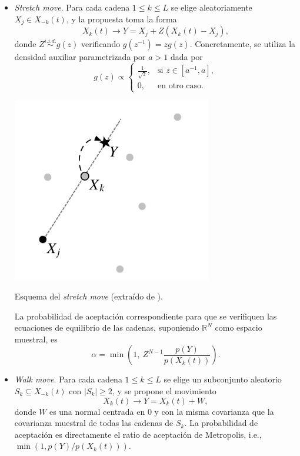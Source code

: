 \documentclass[
  a4paper,
	fontsize=11pt, %
	twoside=false, %
  secnumdepth=2,
	numbers=noenddot, %
]{kaohandt}
\newcommand{\R} {\ensuremath{\mathds{R}}}
\begin{document}
\begin{itemize}
  \item \textit{Stretch move}. Para cada cadena \(1\leq k \leq L\) se elige aleatoriamente \(X_j \in X_{-k}(t)\), y la propuesta toma la forma
  \[
    X_k(t) \to Y = X_j + Z(X_k(t) - X_j),
  \]
  donde \(Z \stackrel{i.i.d.}{\sim} g(z)\) verificando \(g(z^{-1})=zg(z)\). Concretamente, se utiliza la densidad auxiliar parametrizada por \(a > 1\) dada por
  \[
  g(z) \propto \begin{cases}
    \frac{1}{\sqrt{z}}, & \text{si } z \in [a^{-1}, a],\\
    0, & \text{en otro caso.}
\end{cases}
  \]
  \begin{marginfigure}[*-1]
  \centering
  \includegraphics[width=.8\textwidth]{img/goodman_weare}
  \caption*{Esquema del \textit{stretch move} (extraído de \cite{goodman2010ensemble}).}
\end{marginfigure}

  La probabilidad de aceptación correspondiente para que se verifiquen las ecuaciones de equilibrio de las cadenas, suponiendo \(\R^N\) como espacio muestral, es
  \[
    \alpha = \min\left(1, \ Z^{N-1}\frac{p(Y)}{p(X_k(t))}\right).
  \]

  \item \textit{Walk move}. Para cada cadena \(1\leq k \leq L\) se elige un subconjunto aleatorio \(S_k \subseteq X_{-k}(t)\) con \(|S_k| \geq 2\), y se propone el movimiento
\[
X_k(t) \to Y = X_k(t) + W,
\]
donde \(W\) es una normal centrada en \(0\) y con la misma covarianza que la covarianza muestral de todas las cadenas de \(S_k\). La probabilidad de aceptación es directamente el ratio de aceptación de Metropolis, i.e., \(\min(1, p(Y)/p(X_k(t)))\).
\end{itemize}
\end{document}
